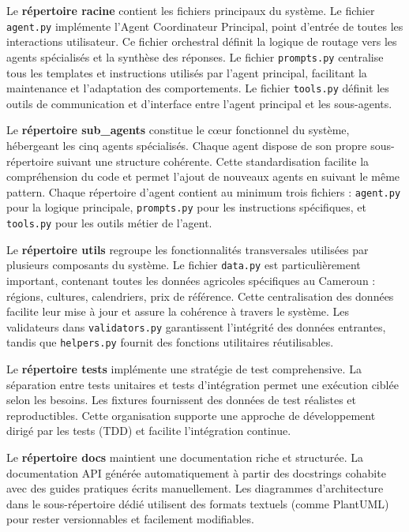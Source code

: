 Le \textbf{répertoire racine} contient les fichiers principaux du système. Le fichier \texttt{agent.py} implémente l'Agent Coordinateur Principal, point d'entrée de toutes les interactions utilisateur. Ce fichier orchestral définit la logique de routage vers les agents spécialisés et la synthèse des réponses. Le fichier \texttt{prompts.py} centralise tous les templates et instructions utilisés par l'agent principal, facilitant la maintenance et l'adaptation des comportements. Le fichier \texttt{tools.py} définit les outils de communication et d'interface entre l'agent principal et les sous-agents.

Le \textbf{répertoire sub\_agents} constitue le cœur fonctionnel du système, hébergeant les cinq agents spécialisés. Chaque agent dispose de son propre sous-répertoire suivant une structure cohérente. Cette standardisation facilite la compréhension du code et permet l'ajout de nouveaux agents en suivant le même pattern. Chaque répertoire d'agent contient au minimum trois fichiers : \texttt{agent.py} pour la logique principale, \texttt{prompts.py} pour les instructions spécifiques, et \texttt{tools.py} pour les outils métier de l'agent.

Le \textbf{répertoire utils} regroupe les fonctionnalités transversales utilisées par plusieurs composants du système. Le fichier \texttt{data.py} est particulièrement important, contenant toutes les données agricoles spécifiques au Cameroun : régions, cultures, calendriers, prix de référence. Cette centralisation des données facilite leur mise à jour et assure la cohérence à travers le système. Les validateurs dans \texttt{validators.py} garantissent l'intégrité des données entrantes, tandis que \texttt{helpers.py} fournit des fonctions utilitaires réutilisables.

Le \textbf{répertoire tests} implémente une stratégie de test comprehensive. La séparation entre tests unitaires et tests d'intégration permet une exécution ciblée selon les besoins. Les fixtures fournissent des données de test réalistes et reproductibles. Cette organisation supporte une approche de développement dirigé par les tests (TDD) et facilite l'intégration continue.

Le \textbf{répertoire docs} maintient une documentation riche et structurée. La documentation API générée automatiquement à partir des docstrings cohabite avec des guides pratiques écrits manuellement. Les diagrammes d'architecture dans le sous-répertoire dédié utilisent des formats textuels (comme PlantUML) pour rester versionnables et facilement modifiables.

